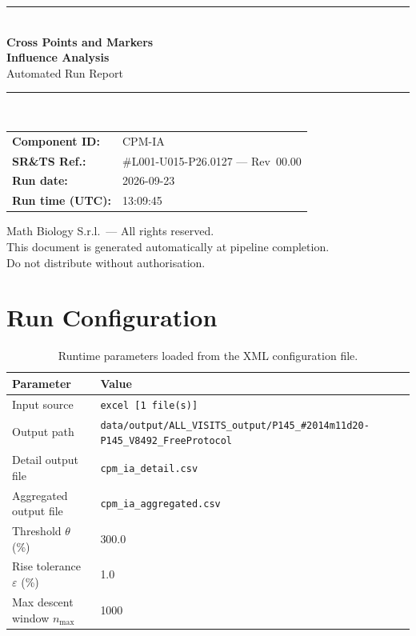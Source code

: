 \documentclass[a4paper,11pt]{article}
\begin{document}
\begin{titlepage}
\begin{center}
  \vspace*{1.8cm}
  {\color{dmaaccent}\rule{\linewidth}{1.5pt}}\\[0.6cm]
  {\LARGE\bfseries\color{dmaaccent}
    Cross Points and Markers\\[0.25cm]
    Influence Analysis}\\[0.4cm]
  {\Large Automated Run Report}\\[0.3cm]
  {\color{dmaaccent}\rule{\linewidth}{1.5pt}}\\[2cm]

  \begin{tabular}{ll}
    \textbf{Component ID:}   & CPM-IA \\[0.3cm]
    \textbf{SR\&TS Ref.:}    & \#L001-U015-P26.0127 --- Rev~00.00 \\[0.3cm]
    \textbf{Run date:}       & 2026-09-23 \\[0.3cm]
    \textbf{Run time (UTC):} & 13:09:45 \\
  \end{tabular}

  \vfill
  {\color{dmagray}\small
    Math Biology S.r.l.\ --- All rights reserved.\\
    This document is generated automatically at pipeline completion.\\
    Do not distribute without authorisation.}
\end{center}
\end{titlepage}

\tableofcontents
\clearpage

\section{Run Configuration}

\begin{table}[h!]
\centering
\small
\caption{Runtime parameters loaded from the XML configuration file.}
\begin{tabular}{ll}
\toprule
\textbf{Parameter} & \textbf{Value} \\
\midrule
Input source                      & \texttt{excel [1 file(s)]} \\
Output path                       & \texttt{data/output/ALL\_VISITS\_output/P145\_\#2014m11d20-P145\_V8492\_FreeProtocol} \\
Detail output file                & \texttt{cpm\_ia\_detail.csv} \\
Aggregated output file            & \texttt{cpm\_ia\_aggregated.csv} \\
Threshold $\theta$ (\%)           & 300.0 \\
Rise tolerance $\varepsilon$ (\%) & 1.0 \\
Max descent window $n_{\max}$     & 1000 \\
\bottomrule
\end{tabular}
\end{table}
\end{document}
